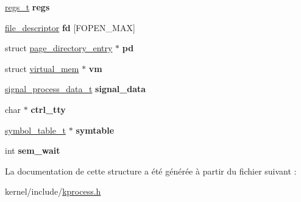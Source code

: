 \begin{DoxyCompactItemize}
\item 
\hypertarget{structprocess__t_ac06891b69a96f5f2da7e467e3c4fcc34}{\hyperlink{structregs__t}{regs\-\_\-t} {\bfseries regs}}\label{structprocess__t_ac06891b69a96f5f2da7e467e3c4fcc34}

\item 
\hypertarget{structprocess__t_a36b1262923c31b95f120cc9b0fb89744}{\hyperlink{struct__file__descriptor}{file\-\_\-descriptor} {\bfseries fd} \mbox{[}F\-O\-P\-E\-N\-\_\-\-M\-A\-X\mbox{]}}\label{structprocess__t_a36b1262923c31b95f120cc9b0fb89744}

\item 
\hypertarget{structprocess__t_a4fdbb20004015f653edfd8f9a3f22bde}{struct \hyperlink{structpage__directory__entry}{page\-\_\-directory\-\_\-entry} $\ast$ {\bfseries pd}}\label{structprocess__t_a4fdbb20004015f653edfd8f9a3f22bde}

\item 
\hypertarget{structprocess__t_a5a27e517888b2d262fc0f48df67a0ffb}{struct \hyperlink{structvirtual__mem}{virtual\-\_\-mem} $\ast$ {\bfseries vm}}\label{structprocess__t_a5a27e517888b2d262fc0f48df67a0ffb}

\item 
\hypertarget{structprocess__t_a38e0473349d20cb95b511d8be0a82323}{\hyperlink{structsignal__process__data__t}{signal\-\_\-process\-\_\-data\-\_\-t} {\bfseries signal\-\_\-data}}\label{structprocess__t_a38e0473349d20cb95b511d8be0a82323}

\item 
\hypertarget{structprocess__t_a345124afd3f5f75fdc291d9076348950}{char $\ast$ {\bfseries ctrl\-\_\-tty}}\label{structprocess__t_a345124afd3f5f75fdc291d9076348950}

\item 
\hypertarget{structprocess__t_a2d3232975904be6c800c2cdb6ef73732}{\hyperlink{structsymbol__table__t}{symbol\-\_\-table\-\_\-t} $\ast$ {\bfseries symtable}}\label{structprocess__t_a2d3232975904be6c800c2cdb6ef73732}

\item 
\hypertarget{structprocess__t_a99c0e9d8a303b8890da048861e8c560e}{int {\bfseries sem\-\_\-wait}}\label{structprocess__t_a99c0e9d8a303b8890da048861e8c560e}

\end{DoxyCompactItemize}


La documentation de cette structure a été générée à partir du fichier suivant \-:\begin{DoxyCompactItemize}
\item 
kernel/include/\hyperlink{kprocess_8h}{kprocess.\-h}\end{DoxyCompactItemize}
